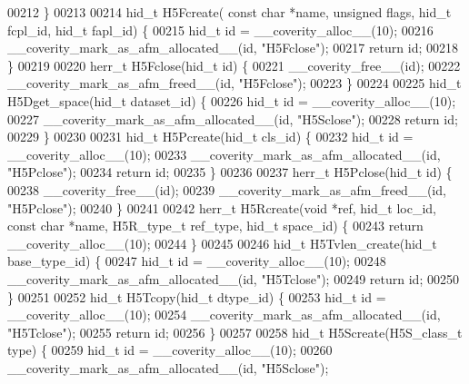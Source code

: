 \begin{DoxyCode}
00212 \}
00213 
00214 hid\_t H5Fcreate( \textcolor{keyword}{const} \textcolor{keywordtype}{char} *name, \textcolor{keywordtype}{unsigned} flags, hid\_t fcpl\_id, hid\_t fapl\_id) \{
00215     hid\_t \textcolor{keywordtype}{id} = \_\_coverity\_alloc\_\_(10);
00216     \_\_coverity\_mark\_as\_afm\_allocated\_\_(\textcolor{keywordtype}{id}, \textcolor{stringliteral}{"H5Fclose"});
00217     \textcolor{keywordflow}{return} id;
00218 \}
00219 
00220 herr\_t H5Fclose(hid\_t \textcolor{keywordtype}{id}) \{
00221     \_\_coverity\_free\_\_(\textcolor{keywordtype}{id});
00222     \_\_coverity\_mark\_as\_afm\_freed\_\_(\textcolor{keywordtype}{id}, \textcolor{stringliteral}{"H5Fclose"});
00223 \}
00224 
00225 hid\_t H5Dget\_space(hid\_t dataset\_id) \{
00226     hid\_t \textcolor{keywordtype}{id} = \_\_coverity\_alloc\_\_(10);
00227     \_\_coverity\_mark\_as\_afm\_allocated\_\_(\textcolor{keywordtype}{id}, \textcolor{stringliteral}{"H5Sclose"});
00228     \textcolor{keywordflow}{return} id;
00229 \}
00230 
00231 hid\_t H5Pcreate(hid\_t cls\_id) \{
00232     hid\_t \textcolor{keywordtype}{id} = \_\_coverity\_alloc\_\_(10);
00233     \_\_coverity\_mark\_as\_afm\_allocated\_\_(\textcolor{keywordtype}{id}, \textcolor{stringliteral}{"H5Pclose"});
00234     \textcolor{keywordflow}{return} id;
00235 \}
00236 
00237 herr\_t H5Pclose(hid\_t \textcolor{keywordtype}{id}) \{
00238     \_\_coverity\_free\_\_(\textcolor{keywordtype}{id});
00239     \_\_coverity\_mark\_as\_afm\_freed\_\_(\textcolor{keywordtype}{id}, \textcolor{stringliteral}{"H5Pclose"});
00240 \}
00241 
00242 herr\_t H5Rcreate(\textcolor{keywordtype}{void} *ref, hid\_t loc\_id, \textcolor{keyword}{const} \textcolor{keywordtype}{char} *name, H5R\_type\_t ref\_type, hid\_t space\_id) \{
00243     \textcolor{keywordflow}{return} \_\_coverity\_alloc\_\_(10);
00244 \}
00245 
00246 hid\_t H5Tvlen\_create(hid\_t base\_type\_id) \{
00247     hid\_t \textcolor{keywordtype}{id} = \_\_coverity\_alloc\_\_(10);
00248     \_\_coverity\_mark\_as\_afm\_allocated\_\_(\textcolor{keywordtype}{id}, \textcolor{stringliteral}{"H5Tclose"});
00249     \textcolor{keywordflow}{return} id;
00250 \}
00251 
00252 hid\_t H5Tcopy(hid\_t dtype\_id) \{
00253     hid\_t \textcolor{keywordtype}{id} = \_\_coverity\_alloc\_\_(10);
00254     \_\_coverity\_mark\_as\_afm\_allocated\_\_(\textcolor{keywordtype}{id}, \textcolor{stringliteral}{"H5Tclose"});
00255     \textcolor{keywordflow}{return} id;
00256 \}
00257 
00258 hid\_t H5Screate(H5S\_class\_t type) \{
00259     hid\_t \textcolor{keywordtype}{id} = \_\_coverity\_alloc\_\_(10);
00260     \_\_coverity\_mark\_as\_afm\_allocated\_\_(\textcolor{keywordtype}{id}, \textcolor{stringliteral}{"H5Sclose"});

\end{DoxyCode}
